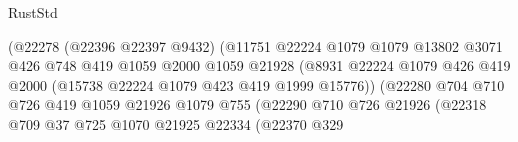 \begin{lexlean}{RustStd}
\begin{coremodule}
                                              (@22278
                                                (@22396 @22397 @9432)
                                                (@11751
                                                  @22224
                                                  @1079
                                                  @1079
                                                  @13802
                                                  @3071
                                                  @426
                                                  @748
                                                  @419
                                                  @1059
                                                  @2000
                                                  @1059
                                                  @21928
                                                  (@8931
                                                    @22224
                                                    @1079
                                                    @426
                                                    @419
                                                    @2000
                                                    (@15738 @22224 @1079 @423 @419 @1999 @15776))
                                                  (@22280
                                                    @704
                                                    @710
                                                    @726
                                                    @419
                                                    @1059
                                                    @21926
                                                    @1079
                                                    @755
                                                    (@22290
                                                      @710
                                                      @726
                                                      @21926
                                                      (@22318
                                                        @709
                                                        @37
                                                        @725
                                                        @1070
                                                        @21925
                                                        @22334
                                                        (@22370
                                                          @329

\end{coremodule}
\end{lexlean}
